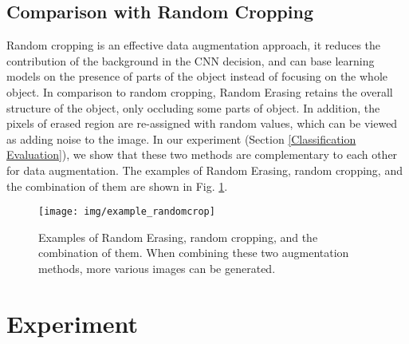 \documentclass[10pt,twocolumn,letterpaper]{article}
\begin{document}
\subsection{Comparison with Random Cropping}
    Random cropping is an effective data augmentation approach, it reduces the contribution of the background in the CNN decision, and can base learning models on the presence of parts of the object instead of focusing on the whole object. In comparison to random cropping, Random Erasing retains the overall structure of the object, only occluding some parts of object. In addition, the pixels of erased region are re-assigned with random values, which can be viewed as adding noise to the image.
    In our experiment (Section \ref{Classification Evaluation}), we show that these two methods are complementary to each other for data augmentation.
    The examples of Random Erasing, random cropping, and the combination of them are shown in Fig. \ref{fig:example_randomcrop}.
\begin{figure}[!t]
\centering
\texttt{[image: img/example\_randomcrop]}
\caption{Examples of Random Erasing, random cropping, and the combination of them. When combining these two augmentation methods, more various images can be generated.}
\label{fig:example_randomcrop}
\end{figure}

\section{Experiment}
\end{document}
